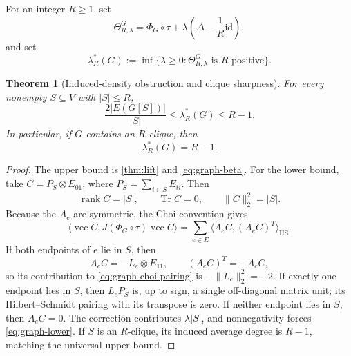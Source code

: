 \documentclass[11pt,reqno]{amsart}
\newtheorem{theorem}{Theorem}[section]
\theoremstyle{remark}
\DeclareMathOperator{\Tr}{Tr}
\DeclareMathOperator{\rank}{rank}
\newcommand{\id}{\mathrm{id}}
\newcommand{\ip}[2]{\langle #1,#2\rangle}
\newcommand{\norm}[1]{\lVert #1\rVert}
\newcommand{\abs}[1]{\lvert #1\rvert}
\newcommand{\vecop}{\operatorname{vec}}
\begin{document}
For an integer $R\ge1$, set
\[
  \Theta^G_{R,\lambda}
  =\Phi_G\circ\tau+
    \lambda\left(\Delta-\frac1R\id\right),
\]
and set
\[
  \lambda_R^*(G)
  :=\inf\{\lambda\ge0:\Theta^G_{R,\lambda}\text{ is $R$-positive}\}.
\]

\begin{theorem}[Induced-density obstruction and clique sharpness]
\label{thm:graph}
For every nonempty $S\subseteq V$ with $\abs S\le R$,
\begin{equation}
\label{eq:graph-lower}
  \frac{2\abs{E(G[S])}}{\abs S}
  \le\lambda_R^*(G)\le R-1.
\end{equation}
In particular, if $G$ contains an $R$-clique, then
\[
  \lambda_R^*(G)=R-1.
\]
\end{theorem}

\begin{proof}
The upper bound is \cref{thm:lift} and
\cref{eq:graph-beta}.  For the lower bound, take
$C=P_S\otimes E_{01}$, where
$P_S=\sum_{i\in S}E_{ii}$.  Then
\[
  \rank C=\abs S,\qquad \Tr C=0,\qquad\norm C_2^2=\abs S.
\]
Because the $A_e$ are symmetric, the Choi convention gives
\begin{equation}
\label{eq:graph-choi-pairing}
  \ip{\vecop C}{J(\Phi_G\circ\tau)\vecop C}
  =
  \sum_{e\in E}
  \ip{A_eC}{(A_eC)^T}_{\mathrm{HS}}.
\end{equation}
If both endpoints of $e$ lie in $S$, then
\[
  A_eC=-L_e\otimes E_{11},
  \qquad
  (A_eC)^T=-A_eC,
\]
so its contribution to \cref{eq:graph-choi-pairing} is
$-\norm{L_e}_2^2=-2$.  If exactly one endpoint lies in $S$, then
$L_eP_S$ is, up to sign, a single off-diagonal matrix unit; its
Hilbert--Schmidt pairing with its transpose is zero.  If neither endpoint
lies in $S$, then $A_eC=0$.  The correction contributes
$\lambda\abs S$, and nonnegativity forces \cref{eq:graph-lower}.  If $S$
is an $R$-clique, its induced average degree is $R-1$, matching the
universal upper bound.
\end{proof}
\end{document}
